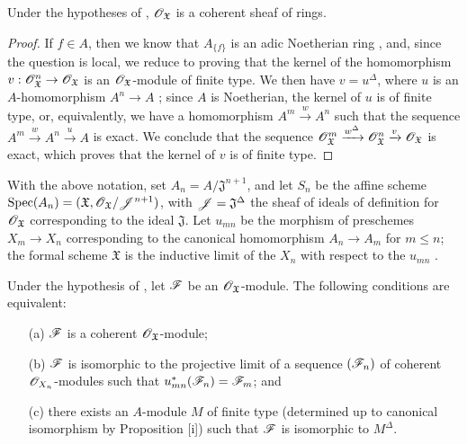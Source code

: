 \begin{proposition}[10.10.3]
\label{1.10.10.3}
Under the hypotheses of , $\mathscr{O}_\mathfrak{X}$ is a coherent sheaf of rings.
\end{proposition}

\begin{proof}
\label{proof-1.10.10.3}
If $f\in A$, then we know that $A_{\{f\}}$ is an adic Noetherian ring , and, since the question is local, we reduce  to proving that the kernel of the homomorphism $v:\sh{O}_\mathfrak{X}^n\to\sh{O}_\mathfrak{X}$ is an $\mathscr{O}_\mathfrak{X}$-module of finite type.
We then have $v=u^\Delta$, where $u$ is an $A$-homomorphism $A^n\to A$ ; since $A$ is Noetherian, the kernel of $u$ is of finite type, or, equivalently, we have a homomorphism $A^m\xrightarrow{w}A^n$ such that the sequence $A^m\xrightarrow{w}A^n\xrightarrow{u}A$ is exact.
We conclude  that the sequence $\mathscr{O}_\mathfrak{X}^m\xrightarrow{w^\Delta}\mathscr{O}_\mathfrak{X}^n\xrightarrow{v}\mathscr{O}_\mathfrak{X}$ is exact, which proves that the kernel of $v$ is of finite type.
\end{proof}

\begin{env}[10.10.4]
\label{1.10.10.4}
With the above notation, set $A_n=A/\mathfrak{J}^{n+1}$, and let $S_n$ be the affine scheme $\operatorname{Spec}(A_n)=(\mathfrak{X},\mathscr{O}_\mathfrak{X}/\mathscr{J}^{n+1})$, with $\mathscr{J}=\mathfrak{J}^\Delta$ the sheaf of ideals of definition for $\mathscr{O}_\mathfrak{X}$ corresponding to the ideal $\mathfrak{J}$.
Let $u_{mn}$ be the morphism of preschemes $X_m\to X_n$ corresponding to the canonical homomorphism $A_n\to A_m$ for $m\leq n$; the formal scheme $\mathfrak{X}$ is the inductive limit of the $X_n$ with respect to the $u_{mn}$ .
\end{env}

\begin{proposition}[10.10.5]
\label{1.10.10.5}
Under the hypothesis of , let $\mathscr{F}$ be an $\mathscr{O}_\mathfrak{X}$-module.
The following conditions are equivalent:
\begin{enumerate}
  \item[\rm{(a)}] $\mathscr{F}$ is a coherent $\mathscr{O}_\mathfrak{X}$-module;
  \item[\rm{(b)}] $\mathscr{F}$ is isomorphic to the projective limit  of a sequence $(\mathscr{F}_n)$ of coherent $\mathscr{O}_{X_n}$-modules such that $u_{mn}^*(\mathscr{F}_n)=\mathscr{F}_m$; and
  \item[\rm{(c)}] there exists an $A$-module $M$ of finite type (determined up to canonical isomorphism by Proposition [i]) such that $\mathscr{F}$ is isomorphic to $M^\Delta$.
\end{enumerate}
\end{proposition}

